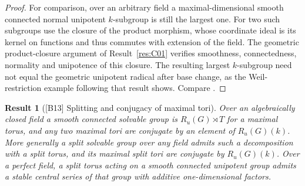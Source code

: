 \documentclass[11pt,a4paper,openany,oneside]{book}
\theoremstyle{resultstyle}
\newtheorem{statement}{Result}[chapter]
\newenvironment{result}[2]{\clubpenalty=10000\begin{statement}[\textnormal{[#1]} #2]\leavevmode\label{res:#1}\ignorespaces}{\end{statement}}
\theoremstyle{definition}
\numberwithin{equation}{chapter}
\begin{document}
\begin{proof}
For comparison, over an arbitrary field a maximal-dimensional
smooth connected normal unipotent \(k\)-subgroup is still the
largest one. For two such subgroups use the closure of the
product morphism, whose coordinate ideal is its kernel on
functions and thus commutes with extension of the field.
The geometric product-closure argument of
Result~\ref{res:C01} verifies smoothness, connectedness,
normality and unipotence of this closure. The resulting
largest \(k\)-subgroup need not equal the geometric unipotent
radical after base change, as the Weil-restriction example
following that result shows.
Compare \cite[Theorems 16.26 and 16.33]{milne}.
\end{proof}

\begin{result}{B13}{Splitting and conjugacy of maximal tori}
Over an algebraically closed field a smooth connected solvable group is
\(R_u(G)\rtimes T\) for a maximal torus, and any two maximal tori
are conjugate by an element of \(R_u(G)(k)\).
More generally a split solvable group over any field admits such a
decomposition with a split torus, and its maximal split tori are
conjugate by \(R_u(G)(k)\).
Over a perfect field, a split torus acting on a smooth connected
unipotent group admits a stable central series of that group with
additive one-dimensional factors.
\end{result}
\end{document}
